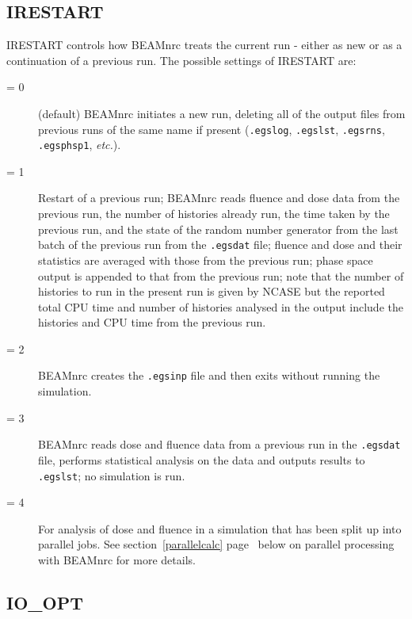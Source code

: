 \documentclass[12pt,twoside]{article}
\newcommand{\etc}{{\em etc.}}
\begin{document}
\subsection{IRESTART}
\label{IRESTART}

IRESTART controls how BEAMnrc treats the current run - either as new or as a
continuation of a previous run. The possible settings of IRESTART are:
\begin{description}
\item [= 0] (default) BEAMnrc initiates a new run, deleting all of the output
files from previous runs of the same name if present
(\verb+.egslog+, \verb+.egslst+, \verb+.egsrns+, \verb+.egsphsp1+,
 \etc).
\item [= 1] Restart of a previous run; BEAMnrc reads fluence and dose data
from the previous run, the number of histories already run, the time
taken by the previous run, and the state of the random number generator from
the last
batch of the previous run from the \verb+.egsdat+ file; fluence and dose and
their statistics are averaged with those from the previous run; phase
space output is appended to that from the previous run; note that the
number of histories to run in the present run is given by NCASE
but the reported total CPU time and number of histories analysed in the
output include the histories and CPU time from the previous run.
\item [= 2] BEAMnrc creates the \verb+.egsinp+ file and then exits without
running the simulation.
\item [= 3] BEAMnrc reads dose and fluence data from a previous run in the
\verb+.egsdat+ file, performs statistical analysis
on the data and outputs results to \verb+.egslst+; no simulation is run.
\item [= 4] For analysis of dose and fluence in a simulation that
has been split up into parallel jobs.  See section~\ref{parallelcalc}
page~\pageref{parallelcalc} below on parallel processing with BEAMnrc
for more details.
\end{description}

\subsection{IO\_OPT}
\label{ioopt}
\end{document}
